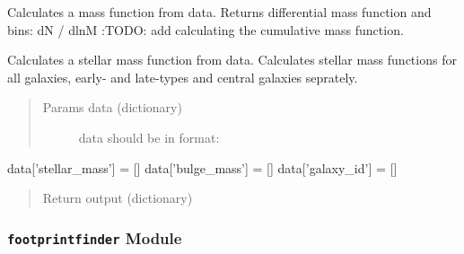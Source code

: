 \documentclass[letterpaper,10pt,english]{sphinxmanual}
\begin{document}

\begin{fulllineitems}
\label{SamPy.astronomy:SamPy.astronomy.differentialfunctions.mass_function}
Calculates a mass function from data.
Returns differential mass function and bins:
dN / dlnM
:TODO: add calculating the cumulative mass function.

\end{fulllineitems}



\begin{fulllineitems}
\label{SamPy.astronomy:SamPy.astronomy.differentialfunctions.stellarMassFunction}
Calculates a stellar mass function from data. Calculates
stellar mass functions for all galaxies, early- and late-types
and central galaxies seprately.
\begin{quote}\begin{description}
\item[{Params data (dictionary)}] \leavevmode
data should be in format:

\end{description}\end{quote}

data{[}'stellar\_mass'{]} = {[}{]}
data{[}'bulge\_mass'{]} = {[}{]}
data{[}'galaxy\_id'{]} = {[}{]}
\begin{quote}\begin{description}
\item[{Return output (dictionary)}] \leavevmode
\end{description}\end{quote}

\end{fulllineitems}



\subsubsection{\texttt{footprintfinder} Module}
\label{SamPy.astronomy:footprintfinder-module}\label{SamPy.astronomy:module-SamPy.astronomy.footprintfinder}
\end{document}
